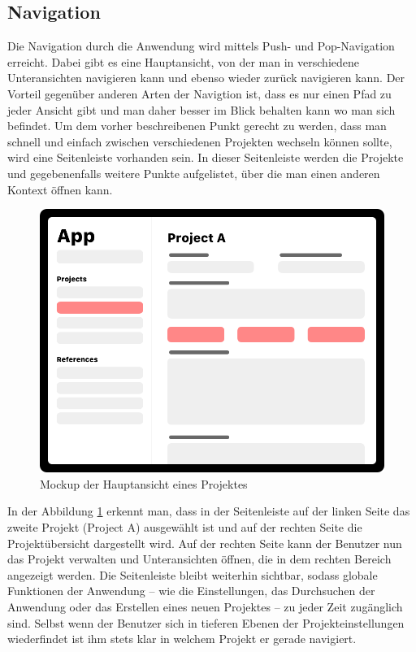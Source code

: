 \subsection{Navigation}
Die Navigation durch die Anwendung wird mittels Push- und Pop-Navigation erreicht.
Dabei gibt es eine Hauptansicht, von der man in verschiedene Unteransichten navigieren kann und ebenso wieder zurück navigieren kann.
Der Vorteil gegenüber anderen Arten der Navigtion ist, dass es nur einen Pfad zu jeder Ansicht gibt und man daher besser im Blick behalten kann wo man sich befindet.
%
Um dem vorher beschreibenen Punkt gerecht zu werden, dass man schnell und einfach zwischen verschiedenen Projekten wechseln können sollte, wird eine Seitenleiste vorhanden sein.
In dieser Seitenleiste werden die Projekte und gegebenenfalls weitere Punkte aufgelistet, über die man einen anderen Kontext öffnen kann.
\begin{figure}[h!]
	\centering
	\vspace{15pt}
	\includegraphics[scale=0.4]{images/design-app}
	\caption{Mockup der Hauptansicht eines Projektes}
	\label{fig:design-app}
\end{figure}
In der Abbildung \ref{fig:design-app} erkennt man, dass in der Seitenleiste auf der linken Seite das zweite Projekt (Project A) ausgewählt ist und auf der rechten Seite die Projektübersicht dargestellt wird.
Auf der rechten Seite kann der Benutzer nun das Projekt verwalten und Unteransichten öffnen, die in dem rechten Bereich angezeigt werden.
Die Seitenleiste bleibt weiterhin sichtbar, sodass globale Funktionen der Anwendung – wie die Einstellungen, das Durchsuchen der Anwendung oder das Erstellen eines neuen Projektes – zu jeder Zeit zugänglich sind.
Selbst wenn der Benutzer sich in tieferen Ebenen der Projekteinstellungen wiederfindet ist ihm stets klar in welchem Projekt er gerade navigiert.

